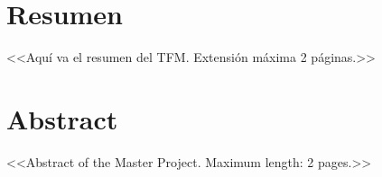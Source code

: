 \chapter*{Resumen}

<<Aquí va el resumen del TFM. Extensión máxima 2 páginas.>>

\newpage

\chapter*{Abstract}

<<Abstract of the Master Project. Maximum length: 2 pages.>>


